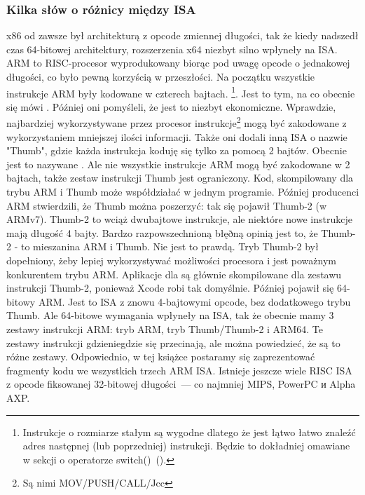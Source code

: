 \subsubsection{Kilka słów o różnicy między \ac{ISA}}
x86 od zawsze był architekturą z opcode zmiennej długości, tak że kiedy nadszedł czas 64-bitowej architektury, rozszerzenia x64 niezbyt silno wpłyneły na  \ac{ISA}.
ARM to \ac{RISC}-procesor wyprodukowany biorąc pod uwagę opcode o jednakowej długości, co było pewną korzyścią w przeszłości. Na początku wszystkie instrukcje ARM były kodowane w czterech bajtach.%
\footnote{
Instrukcje o rozmiarze stałym są wygodne dlatego że jest łątwo łatwo znaleźć adres następnej (lub poprzedniej) instrukcji. Będzie to dokładniej omawiane w sekcji o operatorze switch()~().
}.
Jest to tym, na co obecnie się mówi .
Później oni pomyśleli, że jest to niezbyt ekonomiczne. 
Wprawdzie, najbardziej wykorzystywane przez procesor instrukcje\footnote{Są nimi MOV/PUSH/CALL/Jcc} mogą być zakodowane z wykorzystaniem mniejszej ilości informacji. Także oni dodali inną \ac{ISA} o nazwie "Thumb", gdzie każda instrukcja koduję się tylko za pomocą 2 bajtów. Obecnie jest to nazywane .
Ale nie wszystkie instrukcje ARM mogą być zakodowane w 2 bajtach, także zestaw instrukcji Thumb jest ograniczony. Kod, skompilowany dla trybu ARM i Thumb może współdziałać w jednym programie. Później producenci ARM stwierdzili, że Thumb można poszerzyć: tak się pojawił Thumb-2 (w ARMv7). Thumb-2 to wciąż dwubajtowe instrukcje, ale niektóre nowe instrukcje mają długość 4 bajty. Bardzo razpowszechnioną błęðną opinią jest to, że Thumb-2 - to mieszanina ARM i Thumb. Nie jest to prawdą. Tryb Thumb-2 był dopełniony, żeby lepiej wykorzystywać możliwości procesora i jest poważnym konkurentem trybu ARM. Aplikacje dla \idevices są głównie skompilowane dla zestawu instrukcji Thumb-2, ponieważ Xcode robi tak domyślnie. Później pojawił się 64-bitowy ARM. Jest to \ac{ISA} z znowu 4-bajtowymi opcode, bez dodatkowego trybu Thumb. Ale 64-bitowe wymagania wpłyneły na \ac{ISA}, tak że obecnie mamy 3 zestawy instrukcji ARM: tryb ARM, tryb Thumb/Thumb-2 i ARM64. Te zestawy instrukcji gdzieniegdzie się przecinają, ale można powiedzieć, że są to różne zestawy. Odpowiednio, w tej książce postaramy się zaprezentować fragmenty kodu we wszystkich trzech ARM  \ac{ISA}.
%
%
%
Istnieje jeszcze wiele \ac{RISC} \ac{ISA} z opcode fiksowanej 32-bitowej długości~--- co najmniej MIPS, PowerPC и Alpha AXP.

